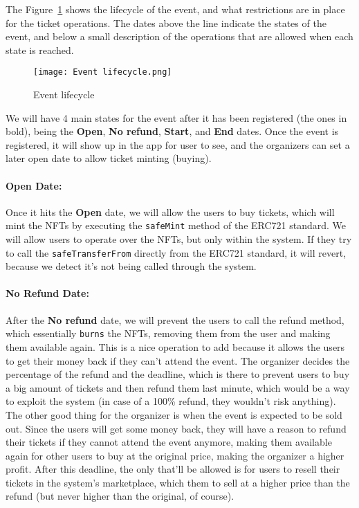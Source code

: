 The Figure~\ref{fig:event_lifecycle} shows the lifecycle of the event, and what
restrictions are in place for the ticket operations. The dates above the line
indicate the states of the event, and below a small description of the
operations that are allowed when each state is reached.

\begin{figure}[H]
	\texttt{[image: Event lifecycle.png]}
	\centering
	\caption{Event lifecycle}\label{fig:event_lifecycle}
\end{figure}

We will have 4 main states for the event after it has been registered (the ones
in bold), being the \textbf{Open}, \textbf{No refund}, \textbf{Start}, and
\textbf{End} dates. Once the event is registered, it will show up in the app
for user to see, and the organizers can set a later open date to allow ticket
minting (buying).

\paragraph{Open Date:} Once it hits the \textbf{Open} date, we will allow the users to buy tickets,
which will mint the NFTs by executing the \texttt{safeMint} method of the
ERC721 standard. We will allow users to operate over the NFTs, but only within
the system. If they try to call the \texttt{safeTransferFrom} directly from the
ERC721 standard, it will revert, because we detect it's not being called
through the system.

\paragraph{No Refund Date:} After the \textbf{No refund} date, we will prevent the users to call the refund
method, which essentially \texttt{burns} the NFTs, removing them from the user
and making them available again. This is a nice operation to add because it
allows the users to get their money back if they can't attend the event. The
organizer decides the percentage of the refund and the deadline, which is there
to prevent users to buy a big amount of tickets and then refund them last
minute, which would be a way to exploit the system (in case of a 100\% refund,
they wouldn't risk anything). The other good thing for the organizer is when
the event is expected to be sold out. Since the users will get some money back,
they will have a reason to refund their tickets if they cannot attend the event
anymore, making them available again for other users to buy at the original
price, making the organizer a higher profit. After this deadline, the only
that'll be allowed is for users to resell their tickets in the system's
marketplace, which them to sell at a higher price than the refund (but never
higher than the original, of course).

